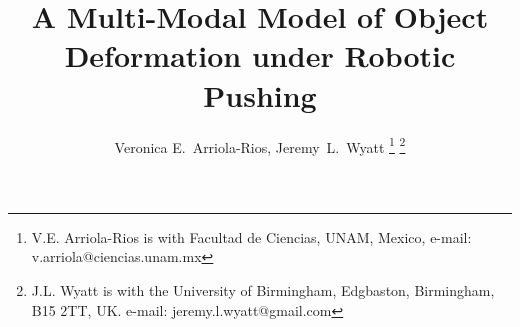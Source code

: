 \documentclass[journal]{IEEEtran}
\begin{document}
%
\title{A Multi-Modal Model of Object Deformation under Robotic Pushing
}
%
%
%

\author{Veronica E.~Arriola-Rios,
        Jeremy~L.~Wyatt \thanks{V.E. Arriola-Rios is with Facultad de Ciencias, UNAM, Mexico, e-mail: v.arriola@ciencias.unam.mx}
        \thanks{J.L. Wyatt is with the University of Birmingham, Edgbaston, Birmingham, B15 2TT, UK. e-mail: jeremy.l.wyatt@gmail.com }}%

% 
%
\end{document}

